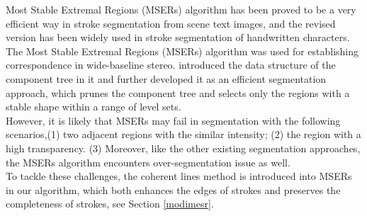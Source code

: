 Most Stable Extremal Regions (MSERs) algorithm\cite{matas2004robust} has been proved to be a very efficient way in stroke segmentation from scene text images\cite{neumann2011text}\cite{gomez2013multi}, 
and the revised version has been widely used in stroke segmentation of handwritten characters\cite{gomez2016fast}.\\
The Most Stable Extremal Regions (MSERs) algorithm\cite{matas2004robust} was used for establishing correspondence in wide-baseline stereo.\cite{donoser2006efficient} introduced the data structure of the component tree in it and further developed it as an efficient segmentation approach, which prunes the component tree and selects only the regions with a stable shape within a range of level sets.\\
However, it is likely that MSERs may fail in segmentation with the following scenarios,\newline (1) two adjacent regions with the similar intensity; \newline (2) the region with a high transparency. \newline
(3) Moreover, like the other existing segmentation approaches, the MSERs algorithm encounters over-segmentation issue as well. \\
To tackle these challenges, the coherent lines method \cite{kang2007coherent} is introduced into MSERs in our algorithm, which both enhances the edges of strokes and preserves the completeness of strokes, see Section \ref{modimesr}. 

\newpage